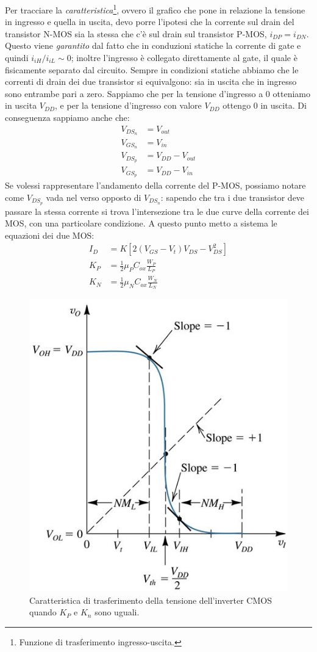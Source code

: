 \documentclass[
]{book}
\begin{document}
Per tracciare la \emph{caratteristica}\footnote{Funzione di
  trasferimento ingresso-uscita.}, ovvero il grafico che pone in
relazione la tensione in ingresso e quella in uscita, devo porre
l'ipotesi che la corrente sul drain del transistor N-MOS sia la stessa
che c'è sul drain sul transistor P-MOS, \(i_{DP}=i_{DN}\). Questo viene
\emph{garantito} dal fatto che in conduzioni statiche la corrente di
gate e quindi \(i_{iH}/i_{iL}\sim 0\); inoltre l'ingresso è collegato
direttamente al gate, il quale è fisicamente separato dal circuito.
Sempre in condizioni statiche abbiamo che le correnti di drain dei due
transistor si equivalgono: sia in uscita che in ingresso sono entrambe
pari a zero. \newline Sappiamo che per la tensione d'ingresso a 0
otteniamo in uscita \(V_{DD}\), e per la tensione d'ingresso con valore
\(V_{DD}\) ottengo 0 in uscita. Di conseguenza sappiamo anche che:
\begin{align*}
V_{DS_{n}}&=V_{out}\\
V_{GS_{n}}&=V_{in}\\
V_{DS_{p}}&= V_{DD}-V_{out}\\
V_{GS_{p}}&=V_{DD}-V_{in}
\end{align*} Se volessi rappresentare l'andamento della corrente del
P-MOS, possiamo notare come \(V_{DS_{p}}\) vada nel verso opposto di
\(V_{DS_{n}}\): sapendo che tra i due transistor deve passare la stessa
corrente si trova l'intersezione tra le due curve della corrente dei
MOS, con una particolare condizione. A questo punto metto a sistema le
equazioni dei due MOS: \begin{align*}
I_D&=K[2(V_{GS}-V_t)V_{DS}-V_{DS}^2] \\
K_{P}&=\frac{1}{2}\mu_{P}C_{ox}\frac{W_{P}}{L_{P}}\\
K_{N}&=\frac{1}{2}\mu_{N}C_{ox}\frac{W_{N}}{L_{N}}
\end{align*}

\begin{figure}
\centering
\includegraphics[width=0.4\linewidth,height=\textheight,keepaspectratio]{assets/imgs/curva_cmos_not_tensione.png}
\caption{Caratteristica di trasferimento della tensione dell'inverter
CMOS quando \(K_{P}\) e \(K_{n}\) sono uguali.}
\end{figure}
\end{document}
